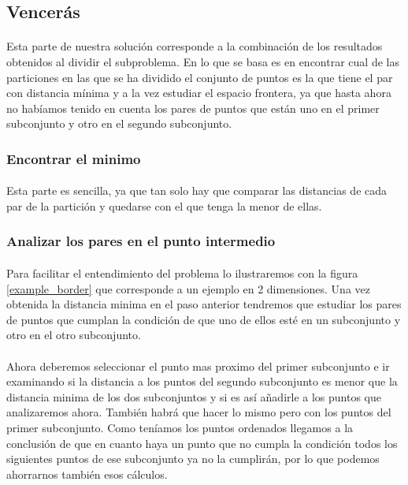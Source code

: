 \documentclass{article}
\begin{document}
	\subsection{Vencerás}
		\paragraph{}
		Esta parte de nuestra solución corresponde a la combinación de los resultados obtenidos al dividir el subproblema. En lo que se basa es en encontrar cual de las particiones en las que se ha dividido el conjunto de puntos es la que tiene el par con distancia mínima y a la vez estudiar el espacio frontera, ya que hasta ahora no habíamos tenido en cuenta los pares de puntos que están uno en el primer subconjunto y otro en el segundo subconjunto.
		\subsubsection{Encontrar el minimo}
		
			\paragraph{}
			Esta parte es sencilla, ya que tan solo hay que comparar las distancias de cada par de la partición y quedarse con el que tenga la menor de ellas.
			
		\subsubsection{Analizar los pares en el punto intermedio}
			
			\paragraph{}
			Para facilitar el entendimiento del problema lo ilustraremos con la figura \ref{example_border} que corresponde a un ejemplo en 2 dimensiones. Una vez obtenida la distancia minima en el paso anterior tendremos que estudiar los pares de puntos que cumplan la condición de que uno de ellos esté en un subconjunto y otro en el otro subconjunto.
			\paragraph{}
			Ahora deberemos seleccionar el punto mas proximo del primer subconjunto e ir examinando si la distancia a los puntos del segundo subconjunto es menor que la distancia minima de los dos subconjuntos y si es así añadirle a los puntos que analizaremos ahora. También habrá que hacer lo mismo pero con los puntos del primer subconjunto. Como teníamos los puntos ordenados llegamos a la conclusión de que en cuanto haya un punto que no cumpla la condición todos los siguientes puntos de ese subconjunto ya no la cumplirán, por lo que podemos ahorrarnos también esos cálculos.
\end{document}
